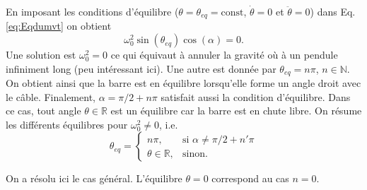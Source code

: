 \par\vspace{2mm}
En imposant les conditions d'équilibre ($\theta = \theta_{eq} = \textrm{const}$, $\dot \theta = 0 $ et $\ddot \theta = 0$) dans Eq. \eqref{eq:Eqdumvt} on obtient
\begin{equation}
     \omega_0^2 \sin(\theta_{eq}) \cos(\alpha)  = 0. \label{eq:thetaeq}
\end{equation}
Une solution est $\omega_0^2 =0$ ce qui équivaut à annuler la gravité o\`u à un pendule infiniment long (peu intéressant ici).
Une autre est donnée par $\theta_{eq}=n\pi$, $n \in \mathbb N$. 
On obtient ainsi que la barre est en équilibre lorsqu'elle forme un angle droit avec le câble.
Finalement, $\alpha=\pi/2+n\pi$ satisfait aussi la condition d'équilibre.
Dans ce cas, tout angle $\theta \in \mathbb R$ est un équilibre car la barre est en chute libre.
On résume les différents équilibres pour $\omega_0^2\neq 0$, i.e.
\begin{equation}
    \theta_{eq}= 
\begin{cases}
    n\pi,& \text{si } \alpha\neq\pi/2 + n'\pi\\
    \theta\in\mathbb R, & \text{sinon}.
\end{cases}
\label{eq:thetaeqs}
\end{equation}

On a résolu ici le cas général. 
L'équilibre $\theta=0$ correspond au cas $n=0$.

